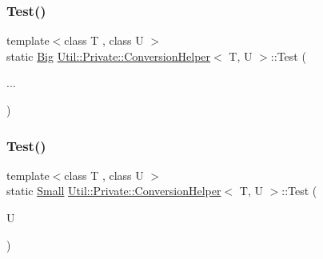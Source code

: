 \mbox{\label{structUtil_1_1Private_1_1ConversionHelper_a70eb55dfb70dbf3459524083d35e350b}} 
\subsubsection{\texorpdfstring{Test()}{Test()}\hspace{0.1cm}{\footnotesize\ttfamily [2/4]}}
{\footnotesize\ttfamily template$<$class T , class U $>$ \\
static \mbox{\hyperlink{structUtil_1_1Private_1_1ConversionHelper_1_1Big}{Big}} \mbox{\hyperlink{structUtil_1_1Private_1_1ConversionHelper}{Util\+::\+Private\+::\+Conversion\+Helper}}$<$ T, U $>$\+::Test (\begin{DoxyParamCaption}\item[{}]{... }\end{DoxyParamCaption})\hspace{0.3cm}{\ttfamily [static]}}

\mbox{\label{structUtil_1_1Private_1_1ConversionHelper_aeee49a75a44a57a9fec054caca088db9}} 
\subsubsection{\texorpdfstring{Test()}{Test()}\hspace{0.1cm}{\footnotesize\ttfamily [3/4]}}
{\footnotesize\ttfamily template$<$class T , class U $>$ \\
static \mbox{\hyperlink{structUtil_1_1Private_1_1ConversionHelper_aaaf6583019b5246d4676b56923632385}{Small}} \mbox{\hyperlink{structUtil_1_1Private_1_1ConversionHelper}{Util\+::\+Private\+::\+Conversion\+Helper}}$<$ T, U $>$\+::Test (\begin{DoxyParamCaption}\item[{U}]{ }\end{DoxyParamCaption})\hspace{0.3cm}{\ttfamily [static]}}

